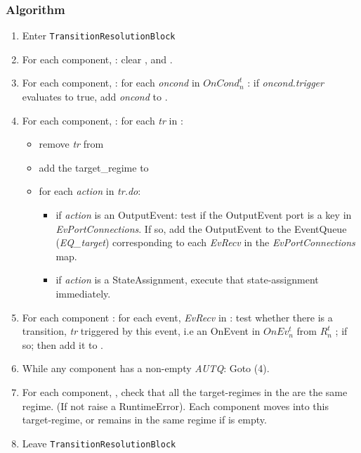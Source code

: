 \documentclass[draftspec]{ninemlspec}
\begin{document}
\subsubsection{Algorithm}

\begin{enumerate}
\item Enter {\tt TransitionResolutionBlock}
\item For each component, \CN: clear \RCLn, \AUTQn and \EQn.
\item For each component, \CN: for each \textsl{oncond} in $OnCond^{t}_{n}$ : if
\textsl{oncond.trigger} evaluates to true, add \textsl{oncond} to \AUTQn.
\item For each component, \CN:  for each \textsl{tr} in \AUTQn :
\begin{itemize}
\item
remove \textsl{tr} from \AUTQn
\item add the target\_regime to \RCLn
\item for each
\textsl{action} in \textsl{tr.do}:
\begin{itemize}
\item if \textsl{action} is an OutputEvent: test
if the OutputEvent port is a key in \textsl{EvPortConnections}. If so, add the
    OutputEvent to the EventQueue (\textsl{EQ\_{target}}) corresponding to each
    \textsl{EvRecv} in the \textsl{EvPortConnections} map.

\item  if \textsl{action}  is a StateAssignment, execute that state-assignment
immediately.
\end{itemize}
\end{itemize}

\item For each component \CN: for each event, \textsl{EvRecv} in \EQn: test
whether there is a transition, \textsl{tr} triggered by this event, i.e an
OnEvent in $OnEv^t_n$ from $R^t_n$ ; if so; then add it to \AUTQn.

\item While any component has a non-empty \textsl{AUTQ}: Goto (4).

\item For each component, \CN, check that all the target-regimes in the \RCLn
are the same regime. (If not raise a RuntimeError). Each component moves into
this target-regime, or remains in the same regime if \RCLn is empty.

\item Leave {\tt TransitionResolutionBlock}

\end{enumerate}
\end{document}

